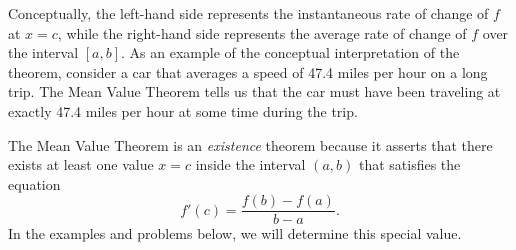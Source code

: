 \documentclass[handout]{ximera}
\begin{document}
\begin{image}
\end{image}

Conceptually, the left-hand side represents the instantaneous rate of change of $f$ at $x = c$, while the
right-hand side represents the average rate of change of $f$ over the interval $[a,b]$. 
As an example of the conceptual interpretation of the theorem, consider a car that 
averages a speed of 47.4 miles per hour on a long trip. 
The Mean Value Theorem tells us that the car must have been 
traveling at exactly 47.4 miles per hour at some time during the trip.

The Mean Value Theorem is an {\it existence} theorem because it asserts that there exists at least one 
value $x=c$ inside the interval $(a,b)$
that satisfies the equation 
\[f'(c) = \frac{f(b) - f(a)}{b-a}.\]
In the examples and problems below, we will determine this special value. 
\end{document}
